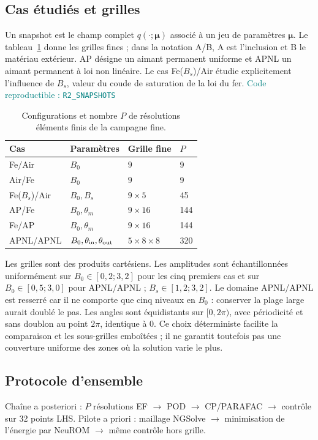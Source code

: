 \documentclass[10pt,a4paper]{article}
\newcommand{\resultbox}[1]{\begin{center}\colorbox{lightteal}{\parbox{.94\linewidth}{\small #1}}\end{center}}
\newcommand{\codecell}[1]{\textcolor{teal}{\textsf{Code reproductible : \texttt{#1}}}}
\begin{document}
\subsection{Cas étudiés et grilles}
Un snapshot est le champ complet $q(\cdot;\bm\mu)$ associé à un jeu de paramètres $\bm\mu$. Le tableau~\ref{tab:grids} donne les grilles fines ; dans la notation A/B, A est l'inclusion et B le matériau extérieur. AP désigne un aimant permanent uniforme et APNL un aimant permanent à loi non linéaire. Le cas Fe($B_s$)/Air étudie explicitement l'influence de $B_s$, valeur du coude de saturation de la loi du fer. \codecell{R2\_SNAPSHOTS}

\begin{table}[ht]
\centering\small
\begin{tabular}{@{}llll@{}}
\toprule
Cas & Paramètres & Grille fine & $P$\\
\midrule
Fe/Air & $B_0$ & $9$ & 9\\
Air/Fe & $B_0$ & $9$ & 9\\
Fe($B_s$)/Air & $B_0,B_s$ & $9\times5$ & 45\\
AP/Fe & $B_0,\theta_m$ & $9\times16$ & 144\\
Fe/AP & $B_0,\theta_m$ & $9\times16$ & 144\\
APNL/APNL & $B_0,\theta_{\rm in},\theta_{\rm out}$ & $5\times8\times8$ & 320\\
\bottomrule
\end{tabular}
\caption{Configurations et nombre $P$ de résolutions éléments finis de la campagne fine.}
\label{tab:grids}
\end{table}

Les grilles sont des produits cartésiens. Les amplitudes sont échantillonnées uniformément sur $B_0\in[0{,}2;3{,}2]$ pour les cinq premiers cas et sur $B_0\in[0{,}5;3{,}0]$ pour APNL/APNL ; $B_s\in[1{,}2;3{,}2]$. Le domaine APNL/APNL est resserré car il ne comporte que cinq niveaux en $B_0$ : conserver la plage large aurait doublé le pas. Les angles sont équidistants sur $[0,2\pi)$, avec périodicité et sans doublon au point $2\pi$, identique à $0$. Ce choix déterministe facilite la comparaison et les sous-grilles emboîtées ; il ne garantit toutefois pas une couverture uniforme des zones où la solution varie le plus.

\subsection{Protocole d'ensemble}
\resultbox{Chaîne a posteriori : $P$ résolutions EF $\rightarrow$ POD $\rightarrow$ CP/PARAFAC $\rightarrow$ contrôle sur 32 points LHS. \quad
Pilote a priori : maillage NGSolve $\rightarrow$ minimisation de l'énergie par NeuROM $\rightarrow$ même contrôle hors grille.}
\end{document}
